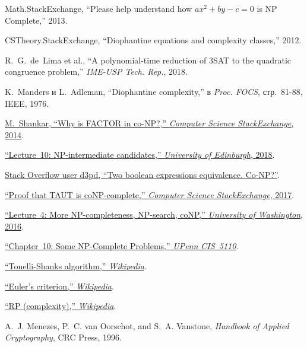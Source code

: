 \documentclass[a4paper,12pt]{article}
\begin{document}
\begin{thebibliography}{}
Math.StackExchange, ``Please help understand how \(ax^2+by-c=0\) is NP Complete,'' 2013.

CSTheory.StackExchange, ``Diophantine equations and complexity classes,'' 2012.

R.~G.~de~Lima et al., ``A polynomial-time reduction of 3SAT to the quadratic congruence problem,'' \emph{IME-USP Tech. Rep.}, 2018.

K.~Manders и L.~Adleman, ``Diophantine complexity,'' в \emph{Proc. FOCS}, стр.~81-88, IEEE, 1976.

\href{https://cs.stackexchange.com/questions/52722/why-is-factor-in-co-np}{M.~Shankar, ``Why is FACTOR in co-NP?,'' \emph{Computer Science StackExchange}, 2014}.

\href{https://www.inf.ed.ac.uk/teaching/courses/cmc/notes/Lecture_10.pdf}{``Lecture~10: NP-intermediate candidates,'' \emph{University of Edinburgh}, 2018}.

\href{https://stackoverflow.com/questions/37185366/two-boolean-expressions-equivalence-co-np}{Stack Overflow user d3pd, ``Two boolean expressions equivalence. Co-NP?''}.

\href{https://cs.stackexchange.com/questions/76579/proof-that-taut-is-conp-complete-or-that-a-problem-is-conp-complete-if-its-comp}{``Proof that TAUT is coNP-complete,'' \emph{Computer Science StackExchange}, 2017}.

\href{https://courses.cs.washington.edu/courses/cse531/16wi/lectures/lect04.pdf}{``Lecture~4: More NP-completeness, NP-search, coNP,'' \emph{University of Washington}, 2016}.

\href{https://www.seas.upenn.edu/~cis5110/notes/cis511-sl15.pdf}{``Chapter~10: Some NP-Complete Problems,'' \emph{UPenn CIS~5110}}.

\href{https://en.wikipedia.org/wiki/Tonelli%E2%80%93Shanks_algorithm}{``Tonelli-Shanks algorithm,'' \emph{Wikipedia}}.

\href{https://en.wikipedia.org/wiki/Euler%27s_criterion}{``Euler's criterion,'' \emph{Wikipedia}}.

\href{https://en.wikipedia.org/wiki/RP_%28complexity%29}{``RP (complexity),'' \emph{Wikipedia}}.

A.~J. Menezes, P.~C. van Oorschot, and S.~A. Vanstone,
\emph{Handbook of Applied Cryptography}, CRC Press, 1996.


\end{thebibliography}
\end{document}
